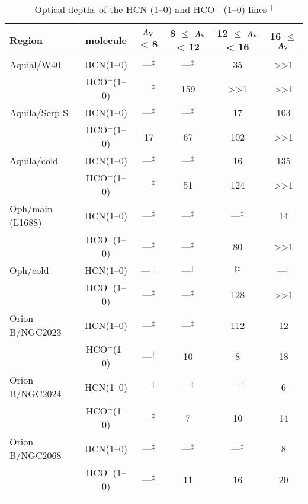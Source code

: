 %
\begin{table*}
\centering
\begin{threeparttable}
\caption{Optical depths of the HCN (1--0) and HCO$^{+}$ (1--0) lines $^\dag$  \label{table:opacity}}
\begin{tabular}{lccccc}
\hline
Region    &  molecule    &  $A_{\rm V}$  < 8   & 8 $\le$ $A_{\rm V}$ < 12  & 12 $\le$ $A_{\rm V}$ < 16 & 16 $\le$ $A_{\rm V}$   \\
\hline
Aquial/W40   &  HCN(1--0)  &  ---$^\ddag$     & ---$^\ddag$   &  35 &  >>1\tnote{$SA$}   \\
                     &  HCO$^+$(1--0)  &  ---$^\ddag$     &  159 &  >>1\tnote{$SA$}  &   >>1\tnote{$SA$}  \\
\hline
Aquila/Serp S& HCN(1--0)    &    ---$^\ddag$   & ---$^\ddag$   &  17  &  103   \\ 
                     &  HCO$^+$(1--0)  &   17    &  67 & 102  &   >>1\tnote{$SA$}  \\
\hline
Aquila/cold& HCN(1--0)    &    ---$^\ddag$   & ---$^\ddag$  & 16   &  135  \\
                     &  HCO$^+$(1--0)  &  ---$^\ddag$     &  51 &  124 &  >>1\tnote{$SA$}   \\
\hline
Oph/main (L1688)&  HCN(1--0)   &   ---$^\ddag$    &  ---$^\ddag$  &  ---$^\ddag$ &  14   \\
                     &  HCO$^+$(1--0)  &   ---$^\ddag$    &  ---$^\ddag$ &  80 &   >>1\tnote{$SA$}   \\
\hline
Oph/cold& HCN(1--0)    &    ----$^\ddag$   &   ---$^\ddag$ & $^\ddag$$^\ddag$  &  ---$^\ddag$   \\
                     &  HCO$^+$(1--0)  &    ---$^\ddag$   & ---$^\ddag$  & 128   &  >>1\tnote{$SA$}    \\
\hline
Orion B/NGC2023&  HCN(1--0)   &  ---$^\ddag$     &  ---$^\ddag$  &  112  &  12   \\
                     &  HCO$^+$(1--0)  &   ---$^\ddag$    &  10  &  8  &    18 \\
\hline
Orion B/NGC2024& HCN(1--0)    &  ---$^\ddag$     &  ---$^\ddag$  &   ---$^\ddag$ &  6  \\
                     &  HCO$^+$(1--0)  &  ---$^\ddag$     &  7  &  10  &   14  \\
\hline
Orion B/NGC2068& HCN(1--0)    &   ---$^\ddag$    & ---$^\ddag$   & ---$^\ddag$   &  8   \\
                     &  HCO$^+$(1--0)  &   ---$^\ddag$    & 11   & 16   &  20  \\
$$
\end{tabular}
\end{threeparttable}
\end{table*}
